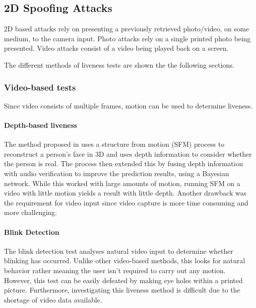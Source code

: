 \documentclass[10pt,a4paper]{article}
\begin{document}
    \subsection{2D Spoofing Attacks}
        2D based attacks rely on presenting a previously retrieved photo/video, on some medium, to the camera input. Photo attacks rely on a single printed photo being presented. Video attacks consist of a video being played back on a screen. \cite{FaceSpoofingAttacksStudy}
        
        The different methods of liveness tests are shown the the following sections.

        \subsubsection{Video-based tests}
        

        Since video consists of multiple frames, motion can be used to determine liveness. 

        \paragraph{Depth-based liveness}

        The method proposed in \cite{SFMClassifier} uses a structure from motion (SFM) process to reconstruct a person's face in 3D and uses depth information to consider whether the person is real. The process then extended this by fusing depth information with audio verification to improve the prediction results, using a Bayesian network. \cite{SFMClassifier} While this worked with large amounts of motion, running SFM on a video with little motion yields a result with little depth. Another drawback was the requirement for video input since video capture is more time consuming and more challenging.
        
        \paragraph{Blink Detection}
        The blink detection test analyses natural video input to determine whether blinking has occurred. Unlike other video-based methods, this looks for natural behavior rather meaning the user isn't required to carry out any motion. \cite{BlinkDetectionLivenessTest} 
        However, this test can be easily defeated by making eye holes within a printed picture. 
        Furthermore, investigating this liveness method is difficult due to the shortage of video data available.
    
\end{document}
